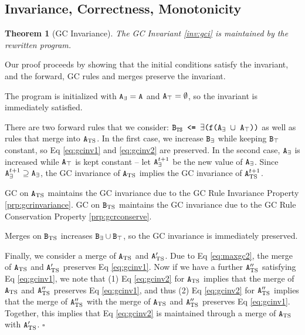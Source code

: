 \documentclass[10pt]{proc}
\numberwithin{equation}{section}
\newtheorem{thm}[theorem]{Theorem}
\newenvironment{proof}[1][Proof]{\begin{trivlist}\item[\hskip \labelsep {\textit {#1:}}]}{\end{trivlist}}
\renewcommand{\tt}[1]{\ifmmode\text{\texttt{#1}}\else\texttt{#1}\fi}
\begin{document}
\subsection{Invariance, Correctness, Monotonicity}
\begin{thm}[GC Invariance]\label{thm:gcinv}
The GC Invariant \ref{inv:gci} is maintained by the rewritten program.
\end{thm}
\begin{proof}
Our proof proceeds by showing that the initial conditions satisfy the invariant, and the forward, GC rules and merges preserve the invariant.

The program is initialized with $\tt{A}_\exists = \tt{A}$ and $\tt{A}_\top = \emptyset$, so the invariant is immediately satisfied.

There are two forward rules that we consider: $\tt{B$_\text{TS}$ <= $\exists$(f(A$_\exists$ $\cup$ A$_\top$))}$ as well as rules that merge into $\tt{A}_\text{TS}$.
In the first case, we increase $\tt{B}_\exists$ while keeping $\tt{B}_\top$ constant, so Eq \eqref{eq:gcinv1} and \eqref{eq:gcinv2} are preserved.
In the second case, $\tt{A}_\exists$ is increased while $\tt{A}_\top$ is kept constant -- let $\tt{A}_\exists^{t+1}$ be the new value of $\tt{A}_\exists$.
Since $\tt{A}_\exists^{t+1} \supseteq \tt{A}_\exists$, the GC invariance of $\tt{A}_\text{TS}$ implies the GC invariance of $\tt{A}_\text{TS}^{t+1}$.

GC on $\tt{A}_\text{TS}$ maintains the GC invariance due to the GC Rule Invariance Property \ref{prp:gcrinvariance}.
GC on $\tt{B}_\text{TS}$ maintains the GC invariance due to the GC Rule Conservation Property \ref{prp:gcrconserve}.

Merges on $\tt{B}_\text{TS}$ increases $\tt{B}_\exists \cup \tt{B}_\top$, so the GC invariance is immediately preserved.

Finally, we consider a merge of $\tt{A}_\text{TS}$ and $\tt{A}_\text{TS}'$.
Due to Eq \eqref{eq:maxgc2}, the merge of $\tt{A}_\text{TS}$ and $\tt{A}_\text{TS}'$ preserves Eq \eqref{eq:gcinv1}.
Now if we have a further $\tt{A}_\text{TS}''$ satisfying Eq \eqref{eq:gcinv1}, we note that (1) Eq \eqref{eq:gcinv2} for $\tt{A}_\text{TS}$ implies that the merge of $\tt{A}_\text{TS}$ and $\tt{A}_\text{TS}''$ preserves Eq \eqref{eq:gcinv1}, and thus (2) Eq \eqref{eq:gcinv2} for $\tt{A}_\text{TS}''$ implies that the merge of $\tt{A}_\text{TS}''$ with the merge of $\tt{A}_\text{TS}$ and $\tt{A}_\text{TS}''$ preserves Eq \eqref{eq:gcinv1}.
Together, this implies that Eq \eqref{eq:gcinv2} is maintained through a merge of $\tt{A}_\text{TS}$ with $\tt{A}_\text{TS}'$.
$\square$
\end{proof}
\end{document}
